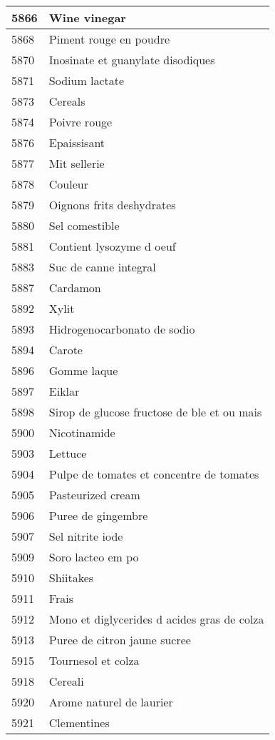 \begin{longtable}{|l|l|}
5866 & Wine vinegar \\ \hline 
5868 & Piment rouge en poudre \\ \hline 
5870 & Inosinate et guanylate disodiques \\ \hline 
5871 & Sodium lactate \\ \hline 
5873 & Cereals \\ \hline 
5874 & Poivre rouge \\ \hline 
5876 & Epaissisant \\ \hline 
5877 & Mit sellerie \\ \hline 
5878 & Couleur \\ \hline 
5879 & Oignons frits deshydrates \\ \hline 
5880 & Sel comestible \\ \hline 
5881 & Contient lysozyme d oeuf \\ \hline 
5883 & Suc de canne integral \\ \hline 
5887 & Cardamon \\ \hline 
5892 & Xylit \\ \hline 
5893 & Hidrogenocarbonato de sodio \\ \hline 
5894 & Carote \\ \hline 
5896 & Gomme laque \\ \hline 
5897 & Eiklar \\ \hline 
5898 & Sirop de glucose fructose de ble et ou mais \\ \hline 
5900 & Nicotinamide \\ \hline 
5903 & Lettuce \\ \hline 
5904 & Pulpe de tomates et concentre de tomates \\ \hline 
5905 & Pasteurized cream \\ \hline 
5906 & Puree de gingembre \\ \hline 
5907 & Sel nitrite iode \\ \hline 
5909 & Soro lacteo em po \\ \hline 
5910 & Shiitakes \\ \hline 
5911 & Frais \\ \hline 
5912 & Mono et diglycerides d acides gras de colza \\ \hline 
5913 & Puree de citron jaune sucree \\ \hline 
5915 & Tournesol et colza \\ \hline 
5918 & Cereali \\ \hline 
5920 & Arome naturel de laurier \\ \hline 
5921 & Clementines \\ \hline 

\end{longtable}
